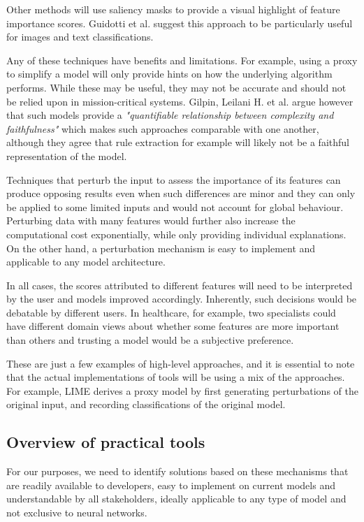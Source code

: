 \documentclass[proposal]{softeng}
\begin{document}
Other methods will use saliency masks to provide a visual highlight of feature importance scores. Guidotti et al. suggest this approach to be particularly useful for images and text classifications.

Any of these techniques have benefits and limitations. For example, using a proxy to simplify a model will only provide hints on how the underlying algorithm performs. While these may be useful, they may not be accurate and should not be relied upon in mission-critical systems. Gilpin, Leilani H. et al. \cite{GilpinLeilaniH} argue however that such models provide a \textit{"quantifiable relationship between
complexity and faithfulness"} which makes such approaches comparable with one another, although they agree that rule extraction for example will likely not be a faithful representation of the model.

Techniques that perturb the input to assess the importance of its features can produce opposing results even when such differences are minor and they can only be applied to some limited inputs and would not account for global behaviour. Perturbing data with many features would further also increase the computational cost exponentially, while only providing individual explanations. On the other hand, a perturbation mechanism is easy to implement and applicable to any model architecture.


In all cases, the scores attributed to different features will need to be interpreted by the user and models improved accordingly. Inherently, such decisions would be debatable by different users. In healthcare, for example, two specialists could have different domain views about whether some features are more important than others and trusting a model would be a subjective preference.

These are just a few examples of high-level approaches, and it is essential to note that the actual implementations of tools will be using a mix of the approaches. For example, LIME \cite{RibeiroMarcoTulio2016WSIT} derives a proxy model by first generating perturbations of the original input, and recording classifications of the original model.

\subsection{Overview of practical tools}
For our purposes, we need to identify solutions based on these mechanisms that are readily available to developers, easy to implement on current models and understandable by all stakeholders, ideally applicable to any type of model and not exclusive to neural networks.
\end{document}
